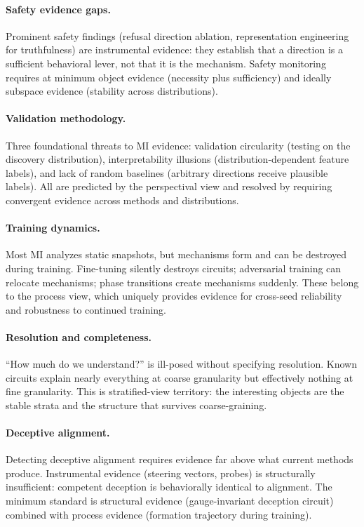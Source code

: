 \documentclass{article}
\begin{document}
\paragraph{Safety evidence gaps.}
Prominent safety findings (refusal direction ablation, representation
engineering for truthfulness) are instrumental evidence: they establish
that a direction is a sufficient behavioral lever, not that it is the
mechanism.  Safety monitoring requires at minimum object evidence
(necessity plus sufficiency) and ideally subspace evidence (stability
across distributions).

\paragraph{Validation methodology.}
Three foundational threats to MI evidence: validation circularity
(testing on the discovery distribution), interpretability illusions
(distribution-dependent feature labels), and lack of random baselines
(arbitrary directions receive plausible labels).  All are predicted by
the perspectival view and resolved by requiring convergent evidence
across methods and distributions.

\paragraph{Training dynamics.}
Most MI analyzes static snapshots, but mechanisms form and can be
destroyed during training.  Fine-tuning silently destroys
circuits; adversarial training can relocate mechanisms; phase
transitions create mechanisms suddenly.  These belong to the process
view, which uniquely provides evidence for cross-seed reliability
and robustness to continued training.

\paragraph{Resolution and completeness.}
``How much do we understand?'' is ill-posed without specifying
resolution.  Known circuits explain nearly everything at coarse
granularity but effectively nothing at fine granularity.  This is
stratified-view territory: the interesting objects are the stable
strata and the structure that survives coarse-graining.

\paragraph{Deceptive alignment.}
Detecting deceptive alignment requires evidence far above what current
methods produce.  Instrumental evidence (steering vectors, probes) is
structurally insufficient: competent deception is behaviorally identical
to alignment.  The minimum standard is structural evidence
(gauge-invariant deception circuit) combined with process evidence
(formation trajectory during training).
\end{document}
